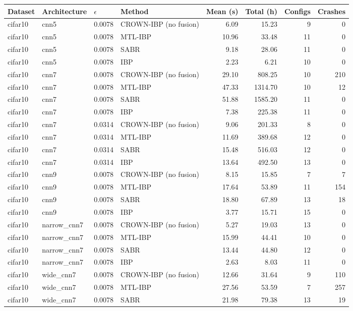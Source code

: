 \begin{tabular}{llllrrrr}
\toprule
Dataset & Architecture & $\epsilon$ & Method & Mean (s) & Total (h) & Configs & Crashes \\
\midrule
cifar10 & cnn5 & 0.0078 & CROWN-IBP (no fusion) & 6.09 & 15.23 & 9 & 0 \\
cifar10 & cnn5 & 0.0078 & MTL-IBP & 10.96 & 33.48 & 11 & 0 \\
cifar10 & cnn5 & 0.0078 & SABR & 9.18 & 28.06 & 11 & 0 \\
cifar10 & cnn5 & 0.0078 & IBP & 2.23 & 6.21 & 10 & 0 \\
cifar10 & cnn7 & 0.0078 & CROWN-IBP (no fusion) & 29.10 & 808.25 & 10 & 210 \\
cifar10 & cnn7 & 0.0078 & MTL-IBP & 47.33 & 1314.70 & 10 & 12 \\
cifar10 & cnn7 & 0.0078 & SABR & 51.88 & 1585.20 & 11 & 0 \\
cifar10 & cnn7 & 0.0078 & IBP & 7.38 & 225.38 & 11 & 0 \\
cifar10 & cnn7 & 0.0314 & CROWN-IBP (no fusion) & 9.06 & 201.33 & 8 & 0 \\
cifar10 & cnn7 & 0.0314 & MTL-IBP & 11.69 & 389.68 & 12 & 0 \\
cifar10 & cnn7 & 0.0314 & SABR & 15.48 & 516.03 & 12 & 0 \\
cifar10 & cnn7 & 0.0314 & IBP & 13.64 & 492.50 & 13 & 0 \\
cifar10 & cnn9 & 0.0078 & CROWN-IBP (no fusion) & 8.15 & 15.85 & 7 & 7 \\
cifar10 & cnn9 & 0.0078 & MTL-IBP & 17.64 & 53.89 & 11 & 154 \\
cifar10 & cnn9 & 0.0078 & SABR & 18.80 & 67.89 & 13 & 18 \\
cifar10 & cnn9 & 0.0078 & IBP & 3.77 & 15.71 & 15 & 0 \\
cifar10 & narrow_cnn7 & 0.0078 & CROWN-IBP (no fusion) & 5.27 & 19.03 & 13 & 0 \\
cifar10 & narrow_cnn7 & 0.0078 & MTL-IBP & 15.99 & 44.41 & 10 & 0 \\
cifar10 & narrow_cnn7 & 0.0078 & SABR & 13.44 & 44.80 & 12 & 0 \\
cifar10 & narrow_cnn7 & 0.0078 & IBP & 2.63 & 8.03 & 11 & 0 \\
cifar10 & wide_cnn7 & 0.0078 & CROWN-IBP (no fusion) & 12.66 & 31.64 & 9 & 110 \\
cifar10 & wide_cnn7 & 0.0078 & MTL-IBP & 27.56 & 53.59 & 7 & 257 \\
cifar10 & wide_cnn7 & 0.0078 & SABR & 21.98 & 79.38 & 13 & 19 \\

\end{tabular}
